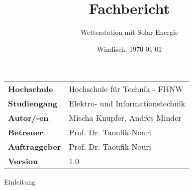\documentclass[final]{fhnwreport}       %
\title{\Huge{\textbf{Fachbericht}}\\}          %
\author{\huge{Wetterstation mit Solar Energie}}          %
\date{Windisch, \today}             %
\begin{document}
\maketitle
\vspace*{-0.5cm}						    %
\vfill
\begin{figure}[H]
\centering
\end{figure}
\vfill

{
\renewcommand\arraystretch{2}
\begin{center}
\begin{tabular}{>{\bf}p{4cm} l}
Hochschule                 &    Hochschule für Technik - FHNW\\
Studiengang                &    Elektro- und Informationstechnik\\
Autor/-en  		           & 	Mischa Knupfer, Andres Minder\\
Betreuer                   &    Prof. Dr. Taoufik Nouri\\
Auftraggeber               &    Prof. Dr. Taoufik Nouri\\
Version                    &    1.0 %
\end{tabular}
\end{center}
}

\clearpage
			
\thispagestyle{empty}


\tableofcontents
\clearpage

Einleitung














{%
}
\end{document}
